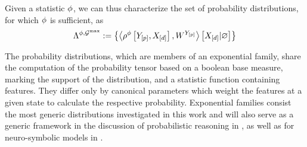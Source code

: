 Given a statistic $\phi$, we can thus characterize the set of probability distributions, for which $\phi$ is sufficient, as
\begin{align*}
    \Lambda^{\phi,\mathcal{G}^{\mathrm{max}}}
    := \left\{\left\langle \rho^{\phi}\left[Y_{[p]},X_{[d]}\right],W^{Y_{[p]}}\right\rangle \left[ X_{[d]} | \varnothing \right] \right\}
\end{align*}





The probability distributions, which are members of an exponential family, share the computation of the probability tensor based on a boolean base measure, marking the support of the distribution, and a statistic function containing features.
They differ only by canonical parameters which weight the features at a given state to calculate the respective probability.
Exponential families consist the most generic distributions investigated in this work and will also serve as a generic framework in the discussion of probabilistic reasoning in , as well as for neuro-symbolic models in .




